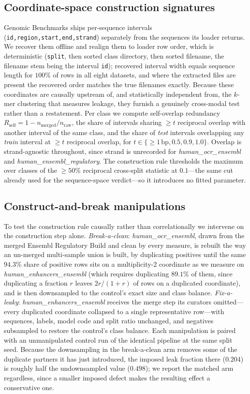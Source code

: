 \subsection{Coordinate-space construction signatures}\label{sec:m-coord}
Genomic Benchmarks ships per-sequence intervals (\texttt{id,region,start,end,strand}) separately from the sequences its loader returns. We recover them offline and realign them to loader row order, which is deterministic (\texttt{split}, then sorted class directory, then sorted filename, the filename stem being the interval \texttt{id}); recovered interval width equals sequence length for $100\%$ of rows in all eight datasets, and where the extracted files are present the recovered order matches the true filenames exactly. Because these coordinates are causally upstream of, and statistically independent from, the $k$-mer clustering that measures leakage, they furnish a genuinely cross-modal test rather than a restatement. Per class we compute self-overlap redundancy $R_{\mathrm{self}}=1-n_{\mathrm{merged}}/n_{\mathrm{raw}}$, the share of intervals sharing $\ge t$ reciprocal overlap with another interval of the same class, and the share of \emph{test} intervals overlapping any \emph{train} interval at $\ge t$ reciprocal overlap, for $t\in\{{\ge}1\,\mathrm{bp},0.5,0.9,1.0\}$. Overlap is strand-agnostic throughout, since strand is unrecorded for \textit{human\_ocr\_ensembl} and \textit{human\_ensembl\_regulatory}. The construction rule thresholds the maximum over classes of the $\ge50\%$ reciprocal cross-split statistic at $0.1$---the same cut already used for the sequence-space verdict---so it introduces no fitted parameter.

\subsection{Construct-and-break manipulations}\label{sec:m-manip}
To test the construction rule causally rather than correlationally we intervene on the construction step alone. \emph{Break-a-clean}: \textit{human\_ocr\_ensembl}, drawn from the merged Ensembl Regulatory Build and clean by every measure, is rebuilt the way an un-merged multi-sample union is built, by duplicating positives until the same $94.3\%$ share of positive rows sits on a multiplicity-2 coordinate as we measure on \textit{human\_enhancers\_ensembl} (which requires duplicating $89.1\%$ of them, since duplicating a fraction $r$ leaves $2r/(1+r)$ of rows on a duplicated coordinate), and is then downsampled to the control's exact size and class balance. \emph{Fix-a-leaky}: \textit{human\_enhancers\_ensembl} receives the merge step its curators omitted---every duplicated coordinate collapsed to a single representative row---with sequences, labels, model code and split ratio unchanged, and negatives subsampled to restore the control's class balance. Each manipulation is paired with an unmanipulated control run of the identical pipeline at the same split seed. Because the downsampling in the break-a-clean arm removes some of the duplicate partners it has just introduced, the imposed leak fraction there ($0.204$) is roughly half the undownsampled value ($0.498$); we report the matched arm regardless, since a smaller imposed defect makes the resulting effect a conservative one.

